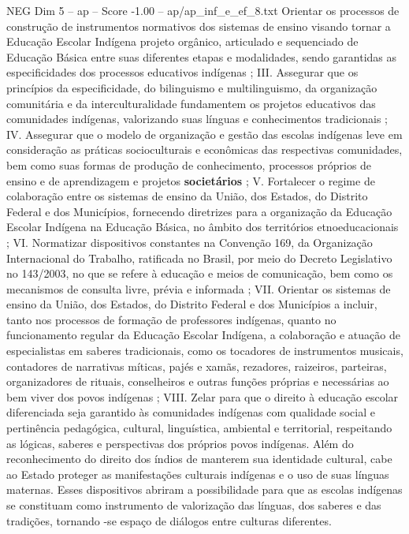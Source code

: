 \begin{textsample}{NEG Dim 5 – ap – Score -1.00 – ap/ap\_inf\_e\_ef\_8.txt}
Orientar os processos de construção de instrumentos normativos dos sistemas de ensino visando tornar a Educação Escolar Indígena projeto orgânico, articulado e sequenciado de Educação Básica entre suas diferentes etapas e modalidades, sendo garantidas as especificidades dos processos educativos indígenas ; III.
Assegurar que os princípios da especificidade, do bilinguismo e multilinguismo, da organização comunitária e da interculturalidade fundamentem os projetos educativos das comunidades indígenas, valorizando suas línguas e conhecimentos tradicionais ; IV.
Assegurar que o modelo de organização e gestão das escolas indígenas leve em consideração as práticas socioculturais e econômicas das respectivas comunidades, bem como suas formas de produção de conhecimento, processos próprios de ensino e de aprendizagem e projetos \textbf{societários} ; V.
Fortalecer o regime de colaboração entre os sistemas de ensino da União, dos Estados, do Distrito Federal e dos Municípios, fornecendo diretrizes para a organização da Educação Escolar Indígena na Educação Básica, no âmbito dos territórios etnoeducacionais ; VI.
Normatizar dispositivos constantes na Convenção 169, da Organização Internacional do Trabalho, ratificada no Brasil, por meio do Decreto Legislativo no 143/2003, no que se refere à educação e meios de comunicação, bem como os mecanismos de consulta livre, prévia e informada ; VII.
Orientar os sistemas de ensino da União, dos Estados, do Distrito Federal e dos Municípios a incluir, tanto nos processos de formação de professores indígenas, quanto no funcionamento regular da Educação Escolar Indígena, a colaboração e atuação de especialistas em saberes tradicionais, como os tocadores de instrumentos musicais, contadores de narrativas míticas, pajés e xamãs, rezadores, raizeiros, parteiras, organizadores de rituais, conselheiros e outras funções próprias e necessárias ao bem viver dos povos indígenas ; VIII.
Zelar para que o direito à educação escolar diferenciada seja garantido às comunidades indígenas com qualidade social e pertinência pedagógica, cultural, linguística, ambiental e territorial, respeitando as lógicas, saberes e perspectivas dos próprios povos indígenas.
Além do reconhecimento do direito dos índios de manterem sua identidade cultural, cabe ao Estado proteger as manifestações culturais indígenas e o uso de suas línguas maternas.
Esses dispositivos abriram a possibilidade para que as escolas indígenas se constituam como instrumento de valorização das línguas, dos saberes e das tradições, tornando -se espaço de diálogos entre culturas diferentes.

\end{textsample}
